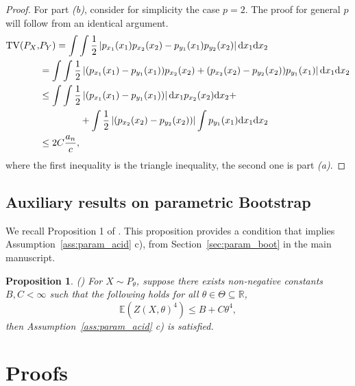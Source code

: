 \documentclass{article}
\newtheorem{proposition}{Proposition}
\theoremstyle{definition}
\newcommand{\di}{{\rm d}}
\renewcommand{\&}{and}
\begin{document}
\begin{proof}
For part \textit{(b)}, consider for simplicity the case $p=2$. The proof for general $p$ will follow from an identical argument.
\begin{align*}
   \text{TV} (P_X, & P_Y)  =\int\int\frac{1}{2}\left\vert p_{x_1}(x_1) p_{x_2}(x_2) - p_{y_1}(x_1) p_{y_2}(x_2) \right\vert \di x_1 \di x_2 \\
   & =\int\int\frac{1}{2}\left\vert (p_{x_1}(x_1) - p_{y_1}(x_1)) p_{x_2}(x_2) + (p_{x_2}(x_2) -p_{y_2}(x_2)) p_{y_1}(x_1)\right\vert \di x_1 \di x_2 \\
   &\leq \int\int\frac{1}{2}\left\vert (p_{x_1}(x_1) - p_{y_1}(x_1))  \right\vert \di x_1 p_{x_2}(x_2) \di x_2 + \\
   & \hspace{1.5cm} +\int\frac{1}{2}\left\vert (p_{x_2}(x_2) -p_{y_2}(x_2)) \right\vert \int p_{y_1}(x_1) \di x_1 \di x_2 \\
    &\leq 2 C\frac{a_n}{c},
\end{align*}
where the first inequality is the triangle inequality, the second one is part \textit{(a)}. 
\end{proof}

\subsection{Auxiliary results on parametric Bootstrap}\label{sec:natural gradient}

We recall Proposition 1 of \cite{fong2024asymptotics}. This proposition provides a condition that implies Assumption~\ref{ass:param_acid} c), from Section~\ref{sec:param_boot} in the main manuscript.

\begin{proposition}\label{prop:fongyiu}(\cite{fong2024asymptotics}) For $X\sim P_{\theta}$, suppose there exists non-negative constants $B,C<\infty$ such that the following holds for all $\theta\in\Theta \subseteq\mathbb{R}$,
\[
\mathbb{E}(Z(X, \theta)^4) \leq B+C\theta^4,
\]
then Assumption~\ref{ass:param_acid} c) is satisfied. 
\end{proposition}


\section{Proofs} \label{sec:Proofs}
\end{document}
